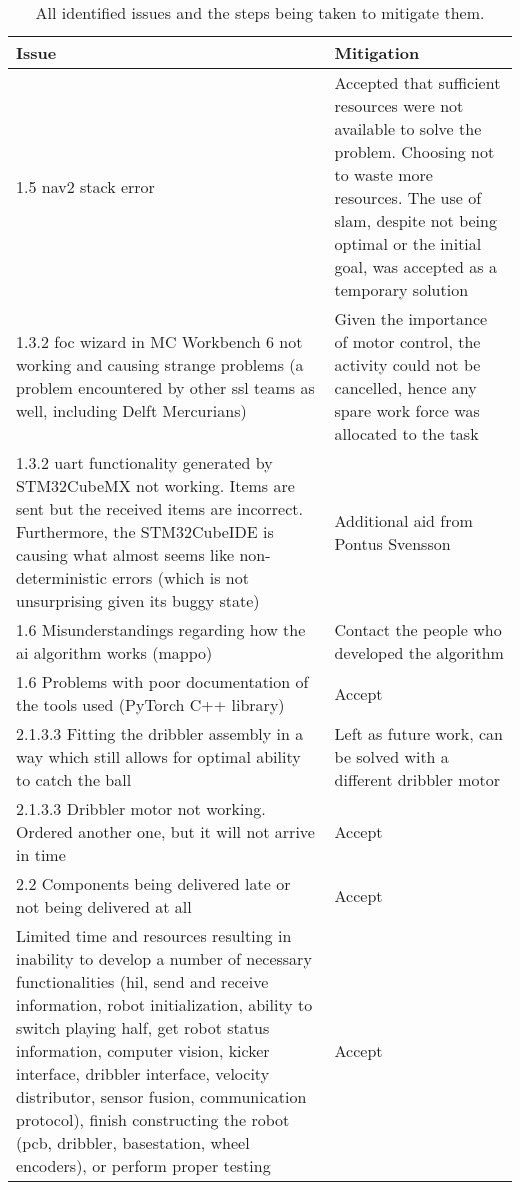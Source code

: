 \begin{table}[H]
    \centering
    \caption{All identified issues and the steps being taken to mitigate them.}
    \label{tab:issues_and_mitigation}
    \begin{tabularx}{\columnwidth}{|X|X|} \hline
         \textbf{Issue} & \textbf{Mitigation} \\ \hline
         1.5 nav2 stack error & Accepted that sufficient resources were not available to solve the problem. Choosing not to waste more resources. The use of \ac{slam}, despite not being optimal or the initial goal, was accepted as a temporary solution \\ \hline
         1.3.2 \acs{foc} wizard in MC Workbench 6 not working and causing strange problems (a problem encountered by other \acs{ssl} teams as well, including Delft Mercurians) & Given the importance of motor control, the activity could not be cancelled, hence any spare work force was allocated to the task \\ \hline
         1.3.2 \acs{uart} functionality generated by STM32CubeMX not working. Items are sent but the received items are incorrect. Furthermore, the STM32CubeIDE is causing what almost seems like non-deterministic errors (which is not unsurprising given its buggy state) & Additional aid from Pontus Svensson \\ \hline 
         1.6 Misunderstandings regarding how the \acs{ai} algorithm works (\acs{mappo}) & Contact the people who developed the algorithm \\ \hline
         1.6 Problems with poor documentation of the tools used (PyTorch C++ library) & Accept \\ \hline
         2.1.3.3 Fitting the dribbler assembly in a way which still allows for optimal ability to catch the ball & Left as future work, can be solved with a different dribbler motor \\ \hline
         2.1.3.3 Dribbler motor not working. Ordered another one, but it will not arrive in time & Accept \\ \hline
         2.2 Components being delivered late or not being delivered at all & Accept \\ \hline
         Limited time and resources resulting in inability to develop a number of necessary functionalities (\acs{hil}, send and receive information, robot initialization, ability to switch playing half, get robot status information, computer vision, kicker interface, dribbler interface, velocity distributor, sensor fusion, communication protocol), finish constructing the robot (\acs{pcb}, dribbler, basestation, wheel encoders), or perform proper testing & Accept \\ \hline
    \end{tabularx}
\end{table}


